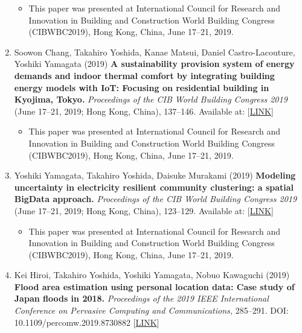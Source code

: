 \documentclass[]{book}
\providecommand{\tightlist}{%
  \setlength{\itemsep}{0pt}\setlength{\parskip}{0pt}}
\begin{document}
\begin{enumerate}
  \begin{itemize}
  \tightlist
  \item
    This paper was presented at International Council for Research and Innovation in Building and Construction World Building Congress (CIBWBC2019), Hong Kong, China, June 17--21, 2019.
  \end{itemize}
\item
  Soowon Chang, Takahiro Yoshida, Kanae Matsui, Daniel Castro-Lacouture, Yoshiki Yamagata (2019)
  \textbf{A sustainability provision system of energy demands and indoor thermal comfort by integrating building energy models with IoT: Focusing on residential building in Kyojima, Tokyo.}
  \emph{Proceedings of the CIB World Building Congress 2019} (June 17--21, 2019; Hong Kong, China), 137--146.
  Available at: {[}\href{https://site.cibworld.nl/dl/publications/WBC19/WBC_Proceedings_June2019_Complete.pdf}{LINK}{]}

  \begin{itemize}
  \tightlist
  \item
    This paper was presented at International Council for Research and Innovation in Building and Construction World Building Congress (CIBWBC2019), Hong Kong, China, June 17--21, 2019.
  \end{itemize}
\item
  Yoshiki Yamagata, Takahiro Yoshida, Daisuke Murakami (2019)
  \textbf{Modeling uncertainty in electricity resilient community clustering: a spatial BigData approach.}
  \emph{Proceedings of the CIB World Building Congress 2019} (June 17--21, 2019; Hong Kong, China), 123--129.
  Available at: {[}\href{https://site.cibworld.nl/dl/publications/WBC19/WBC_Proceedings_June2019_Complete.pdf}{LINK}{]}

  \begin{itemize}
  \tightlist
  \item
    This paper was presented at International Council for Research and Innovation in Building and Construction World Building Congress (CIBWBC2019), Hong Kong, China, June 17--21, 2019.
  \end{itemize}
\item
  Kei Hiroi, Takahiro Yoshida, Yoshiki Yamagata, Nobuo Kawaguchi (2019)
  \textbf{Flood area estimation using personal location data: Case study of Japan floods in 2018.}
  \emph{Proceedings of the 2019 IEEE International Conference on Pervasive Computing and Communications,} 285--291.
  DOI: 10.1109/percomw.2019.8730882 {[}\href{https://ieeexplore.ieee.org/document/8730882}{LINK}{]}


\end{enumerate}
\end{document}
